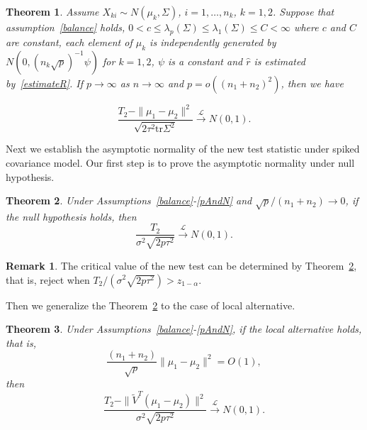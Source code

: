\documentclass[review]{elsarticle}
\theoremstyle{plain}
\newtheorem{theorem}{\quad\quad Theorem}
\theoremstyle{definition}
\newtheorem{remark}{\quad\quad Remark}
\theoremstyle{remark}
\begin{document}
\begin{theorem}\label{sameTheorem}
   Assume $X_{ki}\sim N(\mu_k,\Sigma)$,  $i=1,\ldots,n_k$, $k=1,2$. Suppose that assumption~\ref{balance} holds, $0<c\leq\lambda_p(\Sigma)\leq\lambda_1(\Sigma)\leq C<\infty$ where $c$ and $C$ are constant, each element of $\mu_k$ is independently generated by $N(0,{(n_k\sqrt{p})}^{-1}\psi)$ for $k=1,2$, $\psi$ is a constant and  $\hat{r}$ is estimated by~\eqref{estimateR}. If $p\to\infty$ as $n\to\infty$ and $p=o({(n_1+n_2)}^2)$, then we have
    
\begin{equation*}
    \frac{T_2-\|\mu_1-\mu_2\|^2}{\sqrt{2\tau^2 \mathrm{tr}\Sigma^2}} \xrightarrow{\mathcal{L}} N(0,1).
\end{equation*}
\end{theorem}


Next we establish the asymptotic normality of the new test statistic under spiked covariance model.
Our first step is to prove the asymptotic normality under null hypothesis.

\begin{theorem}\label{myPanpan}
    Under Assumptions~\ref{balance}-\ref{pAndN} and ${\sqrt{p}}/{(n_1+n_2)}\to 0$,
if the null hypothesis holds, then 
    \begin{equation*}
        \frac{T_2}{\sigma^2\sqrt{2p \tau^2}}\xrightarrow{\mathcal{L}}N(0,1).
    \end{equation*}
\end{theorem} 
\begin{remark}
    The critical value of the new test can be determined by Theorem~\ref{myPanpan}, that is, reject when $T_2/(\sigma^2\sqrt{2p\tau^2})>z_{1-\alpha}$.
\end{remark}
    Then we generalize the Theorem~\ref{myPanpan} to the case of local alternative.

\begin{theorem}\label{spaceEstimation}
    Under Assumptions~\ref{balance}-\ref{pAndN},
if the local alternative holds, that is,
    $$\frac{(n_1+n_2)}{\sqrt{p}}\|\mu_1-\mu_2\|^2=O(1),$$
then 
\begin{equation*}
        \frac{T_2-\|\tilde{V}^T(\mu_1-\mu_2)\|^2}{\sigma^2\sqrt{2p\tau^2}}\xrightarrow{\mathcal{L}}N(0,1).
\end{equation*}
\end{theorem} 

\end{document}
